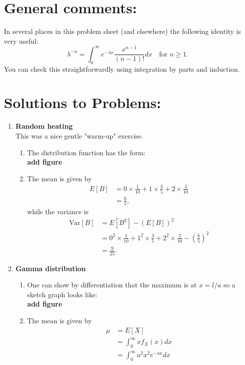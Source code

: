 \documentclass[11pt,a4paper]{article}
\begin{document}
  \section*{General comments:}
  In several places in this problem sheet (and elsewhere) the following identity is very useful:
  $$
    \lambda^{-n} = \int_0^\infty e^{-\lambda x}\frac{x^{n-1}}{(n-1)!}dx\quad \text{for $n \geq 1$}.
  $$
  You can check this straightforwardly using integration by parts and induction.
  \section*{Solutions to Problems:}
  \begin{enumerate}
    \item \textbf{Random heating}\\
    This was a nice gentle "warm-up" exercise.
    \begin{enumerate}
      \item The distribution function has the form:\\
      \textbf{\Huge add figure}
      \item The mean is given by
      \begin{align*}
        E[B]
        &= 0\times \frac{1}{10} + 1\times\frac{3}{5} + 2\times\frac{3}{10}\\
        &= \frac{6}{5},
      \end{align*}
      while the variance is
      \begin{align*}
        \text{Var}[B]
        &= E[B^2] - (E[B])^2\\
        &= 0^2\times\frac{1}{10} + 1^2\times\frac{3}{5} + 2^2\times\frac{3}{10} - \left(\frac{6}{5}\right)^2\\
        &= \frac{9}{25}.
      \end{align*}
    \end{enumerate}
    \item \textbf{Gamma distribution}
    \begin{enumerate}
      \item One can show by differentiation that the maximum is at $x = l/a$ so a sketch graph looks like:\\
      \textbf{\Huge add figure}
      \item The mean is given by
      \begin{align*}
        \mu
        &= E[X]\\
        &= \int_0^\infty xf_X(x)dx\\
        &= \int_0^\infty a^2x^2e^{-ax}dx\\

\end{align*}
\end{enumerate}
\end{enumerate}
\end{document}
